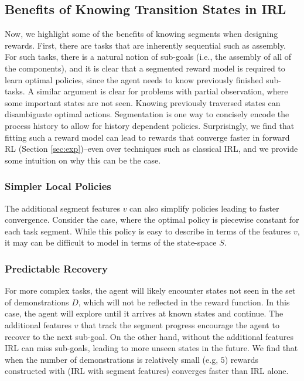 \subsection{Benefits of Knowing Transition States in IRL}
Now, we highlight some of the benefits of knowing segments when designing rewards.
First, there are tasks that are inherently sequential such as assembly.
For such tasks, there is a natural notion of sub-goals (i.e., the assembly of all of the components), and it is clear that a segmented reward model is required to learn optimal policies, since the agent needs to know previously finished sub-tasks.
A similar argument is clear for problems with partial observation, where some important states are not seen.
Knowing previously traversed states can disambiguate optimal actions.
Segmentation is one way to concisely encode the process history to allow for history dependent policies.
Surprisingly, we find that fitting such a reward model can lead to rewards that converge faster in forward RL (Section \ref{sec:exp})--even over techniques such as classical IRL, and we provide some intuition on why this can be the case.

\subsubsection{Simpler Local Policies} The additional segment features $v$ can also simplify policies leading to faster convergence. Consider the case, where the optimal policy is piecewise constant for each task segment. While this policy is easy to describe in terms of the features $v$, it may can be difficult to model in terms of the state-space $S$.

\subsubsection{Predictable Recovery} For more complex tasks, the agent will likely encounter states not seen in the set of demonstrations $D$, which will not be reflected in the reward function. In this case, the agent will explore until it arrives at known states and continue.
The additional features $v$ that track the segment progress encourage the agent to recover to the next sub-goal.
On the other hand, without the additional features IRL can miss sub-goals, leading to more unseen states in the future.
We find that when the number of demonstrations is relatively small (e.g, $5$) rewards constructed with \hirl (IRL with segment features) converges faster than IRL alone.

